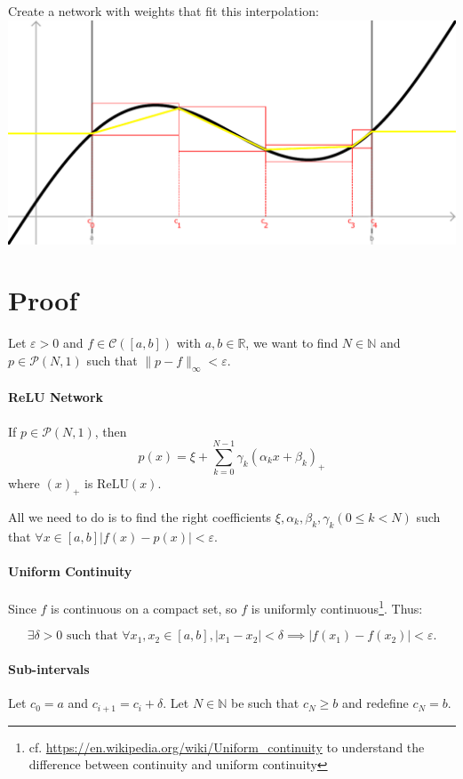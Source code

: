 \documentclass[]{article}
\begin{document}
Create a network with weights that fit this interpolation:\newline
\includegraphics[width=\linewidth]{plot_5}

\section{Proof}
Let $\varepsilon >0$ and $f \in \mathcal{C}(\left[ a,b \right])$ with $a,b \in \mathbb{R}$, we want to find $N \in \mathbb{N}$ and $p \in \mathcal{P}(N,1)$ such that $\|p-f\|_\infty < \varepsilon$.

\paragraph{ReLU Network}
If $p \in \mathcal{P}(N,1)$, then 
$$p(x) = \xi + \sum_{k=0}^{N-1} \gamma_k (\alpha_k x + \beta_k)_+$$
where $(x)_+$ is $\text{ReLU}(x)$.

All we need to do is to find the right coefficients $\xi, \alpha_k, \beta_k, \gamma_k (0 \leq k < N)$ such that $\forall x \in \left[ a,b \right] |f(x)-p(x)| < \varepsilon$.

\paragraph{Uniform Continuity}
Since $f$ is continuous on a compact set, so $f$ is uniformly continuous\footnote{cf. \url{https://en.wikipedia.org/wiki/Uniform_continuity} to understand the difference between continuity and uniform continuity}.
Thus:

$$\exists \delta>0 \text{ such that } \forall x_1,x_2 \in \left[ a,b \right], |x_1-x_2| < \delta \implies |f(x_1) - f(x_2)| < \varepsilon.$$

\paragraph{Sub-intervals}
Let $c_0 = a$ and $c_{i+1} = c_i + \delta$. Let $N \in \mathbb{N}$ be such that $c_N \geq b$ and redefine $c_N = b$.
\end{document}
